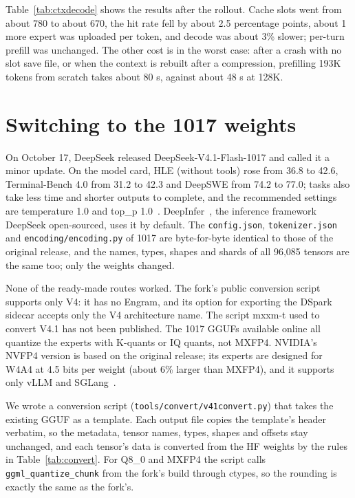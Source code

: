 \documentclass[11pt,a4paper]{article}
\newcommand{\code}[1]{\texttt{#1}}
\begin{document}
Table~\ref{tab:ctxdecode} shows the results after the rollout. Cache slots went from about 780 to about 670, the hit rate fell by about 2.5 percentage points, about 1 more expert was uploaded per token, and decode was about 3\% slower; per-turn prefill was unchanged. The other cost is in the worst case: after a crash with no slot save file, or when the context is rebuilt after a compression, prefilling 193K tokens from scratch takes about 80 s, against about 48 s at 128K.

\section{Switching to the 1017 weights}
\label{sec:w1017}

On October 17, DeepSeek released DeepSeek-V4.1-Flash-1017 and called it a minor update. On the model card, HLE (without tools) rose from 36.8 to 42.6, Terminal-Bench 4.0 from 31.2 to 42.3 and DeepSWE from 74.2 to 77.0; tasks also take less time and shorter outputs to complete, and the recommended settings are temperature 1.0 and top\_p 1.0~\cite{v411017}. DeepInfer~\cite{deepinfer}, the inference framework DeepSeek open-sourced, uses it by default. The \code{config.json}, \code{tokenizer.json} and \code{encoding/encoding.py} of 1017 are byte-for-byte identical to those of the original release, and the names, types, shapes and shards of all 96,085 tensors are the same too; only the weights changed.

None of the ready-made routes worked. The fork's public conversion script supports only V4: it has no Engram, and its option for exporting the DSpark sidecar accepts only the V4 architecture name. The script mxxm-t used to convert V4.1 has not been published. The 1017 GGUFs available online all quantize the experts with K-quants or IQ quants, not MXFP4. NVIDIA's NVFP4 version is based on the original release; its experts are designed for W4A4 at 4.5 bits per weight (about 6\% larger than MXFP4), and it supports only vLLM and SGLang~\cite{nvfp4}.

We wrote a conversion script (\code{tools/convert/v41convert.py}) that takes the existing GGUF as a template. Each output file copies the template's header verbatim, so the metadata, tensor names, types, shapes and offsets stay unchanged, and each tensor's data is converted from the HF weights by the rules in Table~\ref{tab:convert}. For Q8\_0 and MXFP4 the script calls \code{ggml\_quantize\_chunk} from the fork's build through ctypes, so the rounding is exactly the same as the fork's.
\end{document}
